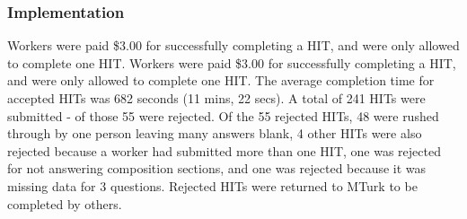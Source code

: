 \subsubsection{Implementation}
Workers were paid \$3.00 for successfully completing a HIT, and were only allowed to complete  one HIT. Workers were paid \$3.00 for successfully completing a HIT, and were only allowed to complete  one HIT.  The average completion time for accepted HITs was 682 seconds (11 mins, 22 secs).  A total of 241 HITs were submitted - of those 55 were rejected.
Of the 55 rejected HITs, 48 were rushed through by one person leaving many answers blank, 4 other HITs were also rejected because a worker had submitted more than one HIT, one was rejected for not answering composition sections, and one was rejected because it was missing data for 3 questions.  Rejected HITs were returned to MTurk to be completed by others.





